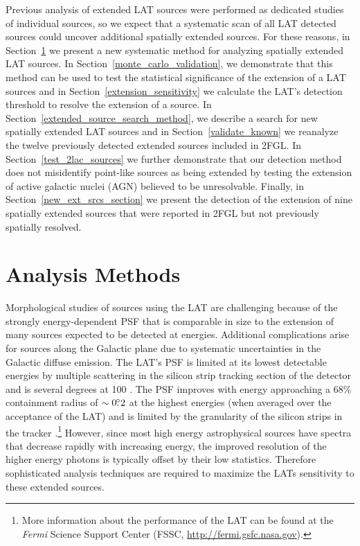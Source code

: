 \documentclass[12pt,preprint]{aastex}
\newcommand{\mev}{\text{MeV}\xspace}
\newcommand{\gev}{\text{GeV}\xspace}
\newcommand{\fermi}{\textit{Fermi}\xspace}
\begin{document}
{Previous analysis of
extended LAT sources were performed as dedicated studies
of individual sources, so we expect
that a systematic scan of all LAT detected sources
could uncover additional spatially extended sources.  For these
reasons, in Section~\ref{analysis_methods_section} we present
a new systematic method for analyzing spatially extended LAT sources. In
Section~\ref{monte_carlo_validation}, we demonstrate that this method
can be used to test the statistical significance of
the extension of
a LAT sources and in Section~\ref{extension_sensitivity} we calculate
the LAT's detection threshold to resolve the extension of a source.
In Section~\ref{extended_source_search_method}, we describe a search for
new spatially extended LAT sources and in Section~\ref{validate_known}
we reanalyze the twelve previously detected extended sources
included in 2FGL.  In Section~\ref{test_2lac_sources} we further
demonstrate that our detection method does not misidentify
point-like sources as being extended 
by testing the extension of active
galactic nuclei (AGN) believed to be unresolvable. Finally, in
Section~\ref{new_ext_srcs_section} we present the detection of the
extension of nine spatially extended sources that were reported in 2FGL
but not previously spatially resolved.

}

\section{Analysis Methods}
\label{analysis_methods_section}

Morphological studies of sources using the LAT are challenging
because of the strongly energy-dependent PSF that is comparable in
size to the extension of many sources expected to be detected at
\gev energies.  Additional complications arise for sources along
the Galactic plane due to systematic uncertainties in the Galactic
diffuse emission.  The LAT's PSF is limited at its lowest detectable
energies by multiple scattering in the silicon strip tracking section
of the detector and is several degrees at 100 \mev.  The PSF improves
with energy approaching a 68\% containment radius of $\sim0\mbox{$.\!\!^\circ$}2$ at
the highest energies (when averaged over the acceptance of the LAT)
and is limited by the granularity of the silicon strips in the tracker
\citep{atwood_LAT_mission,on_orbit_calibration,lat_on_orbit_psf}.\footnote{More
information about the performance of the LAT can be found at the \fermi
Science Support Center (FSSC, \url{http://fermi.gsfc.nasa.gov}).} However,
since most high energy astrophysical sources have spectra that decrease
rapidly with increasing energy, the improved resolution of the higher
energy photons is typically offset by their low statistics. Therefore sophisticated
analysis techniques are required to maximize the LATs sensitivity
to these extended sources.
\end{document}
